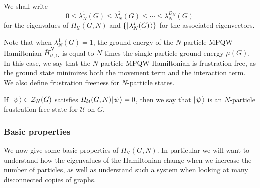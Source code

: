 \documentclass[../thesis-main/thesis-main]{subfiles}
\begin{document}
We shall write
\begin{equation}
  0 \leq \lambda_N^1(G) \leq \lambda_N^2(G) \leq \cdots \leq \lambda_N^{D_N} (G)
\end{equation}
for the eigenvalues of $H_{\mathcal{U}}(G,N)$ and $\{|\mspace{2mu} \lambda_N^j(G) \mspace{2mu} \rangle\}$ for the associated eigenvectors.

Note that when $\lambda_N^1(G) = 1$, the ground energy of the $N$-particle MPQW Hamiltonian $\overline{H}_{\mathcal{U},G}^N$ is equal to $N$ times the single-particle ground energy $\mu(G)$.  In this case, we say that the $N$-particle MPQW Hamiltonian is frustration free, as the ground state minimizes both the movement term and the interaction term.  We also define frustration freeness for $N$-particle states.
\begin{definition}  
If $|\mspace{2mu} \psi \mspace{2mu} \rangle\in \mathcal{Z}_{N}(G)$ satisfies $H_{\mathcal{U}}(G,N) |\mspace{2mu} \psi \mspace{2mu} \rangle = 0$, then we say that $|\mspace{2mu} \psi \mspace{2mu} \rangle$ is an $N$-particle frustration-free state for $\mathcal{U}$ on $G$.
\end{definition}

\subsubsection{Basic properties}

We now give some basic properties of $H_{\mathcal{U}}(G,N)$.  In particular we will want to understand how the eigenvalues of the Hamiltonian change when we increase the number of particles, as well as understand such a system when looking at many disconnected copies of graphs.
\end{document}
